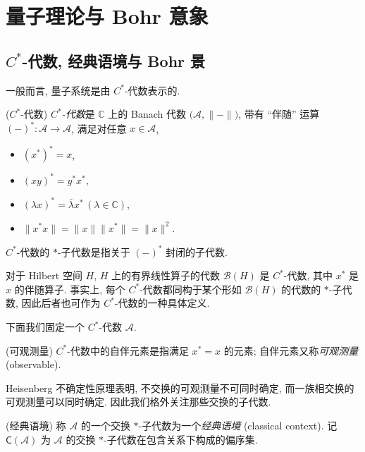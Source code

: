 \section{量子理论与 Bohr 意象}



\subsection{$C^*$-代数, 经典语境与 Bohr 景}

一般而言, 量子系统是由 $C^*$-代数表示的.

\begin{definition}
    {($C^*$-代数)}
    \emph{$C^*$-代数}是 $\mathbb{C}$ 上的 Banach 代数 $\big(\mathcal A,\|{-}\|\big)$,
    带有 ``伴随'' 运算 $(-)^*\colon \mathcal A \to \mathcal A$,
    满足对任意 $x\in \mathcal A$,
    \begin{itemize}
        \item $(x^*)^*=x$,
        \item $(xy)^*=y^*x^*$,
        \item $(\lambda x)^*=\bar\lambda x^*\,(\lambda\in\mathbb{C})$,
        \item $\|x^* x\|=\|x\|\|x^*\|=\|x\|^2$.
    \end{itemize}
    $C^*$-代数的 $*$-子代数是指关于 $(-)^*$ 封闭的子代数.
\end{definition}

\begin{example}
    {}
    对于 Hilbert 空间 $H$, $H$ 上的有界线性算子的代数 $\mathcal B(H)$ 是 $C^*$-代数, 其中 $x^*$ 是 $x$ 的伴随算子. 事实上, 每个 $C^*$-代数都同构于某个形如 $\mathcal B(H)$ 的代数的 $*$-子代数, 因此后者也可作为 $C^*$-代数的一种具体定义.
\end{example}

下面我们固定一个 $C^*$-代数 $\mathcal A$.

\begin{definition}
    {(可观测量)}
    $C^*$-代数中的自伴元素是指满足 $x^*=x$ 的元素; 自伴元素又称\emph{可观测量} (observable).
\end{definition}

Heisenberg 不确定性原理表明, 不交换的可观测量不可同时确定, 而一族相交换的可观测量可以同时确定. 因此我们格外关注那些交换的子代数.

\begin{definition}
    {(经典语境)}
    称 $\mathcal A$ 的一个交换 $*$-子代数为一个\emph{经典语境} (classical context).
    记 $\mathsf C(\mathcal A)$ 为 $\mathcal A$ 的交换 $*$-子代数在包含关系下构成的偏序集.
\end{definition}

